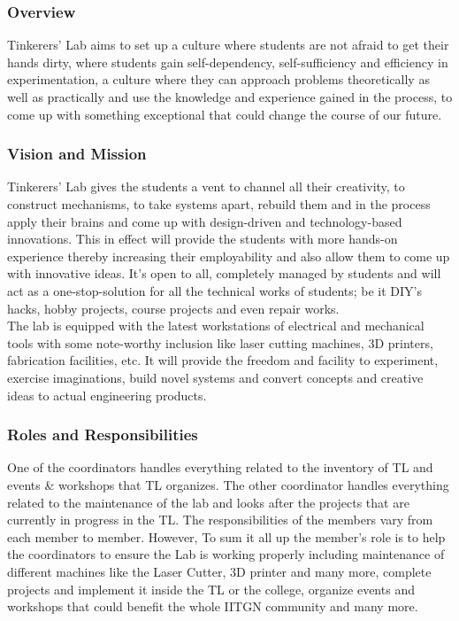 \documentclass[12pt]{article}
\begin{document}
\subsubsection{Overview}
Tinkerers’ Lab aims to set up a culture where students are not afraid to get their hands dirty, where students gain self-dependency, self-sufficiency and efficiency in experimentation, a culture where they can approach problems theoretically as well as practically and use the knowledge and experience gained in the process, to come up with something exceptional that could change the course of our future.

\subsubsection{Vision and Mission}
Tinkerers’ Lab gives the students a vent to channel all their creativity, to construct mechanisms, to take systems apart, rebuild them and in the process apply their brains and come up with design-driven and technology-based innovations. This in effect will provide the students with more hands-on experience thereby increasing their employability and also allow them to come up with innovative ideas. It’s open to all, completely managed by students and will act as a one-stop-solution for all the technical works of students; be it DIY’s hacks, hobby projects, course projects and even repair works. \\

\noindent The lab is equipped with the latest workstations of electrical and mechanical tools with some note-worthy inclusion like laser cutting machines, 3D printers, fabrication facilities, etc. It will provide the freedom and facility to experiment, exercise imaginations, build novel systems and convert concepts and creative ideas to actual engineering products. 

\subsubsection{Roles and Responsibilities}
One of the coordinators handles everything related to the inventory of TL and events \& workshops that TL organizes. The other coordinator handles everything related to the maintenance of the lab and looks after the projects that are currently in progress in the TL. The responsibilities of the members vary from each member to member. However, To sum it all up the member’s role is to help the coordinators to ensure the Lab is working properly including maintenance of different machines like the Laser Cutter, 3D printer and many more, complete projects and implement it inside the TL or the college, organize events and workshops that could
benefit the whole IITGN community and many more.
\end{document}

